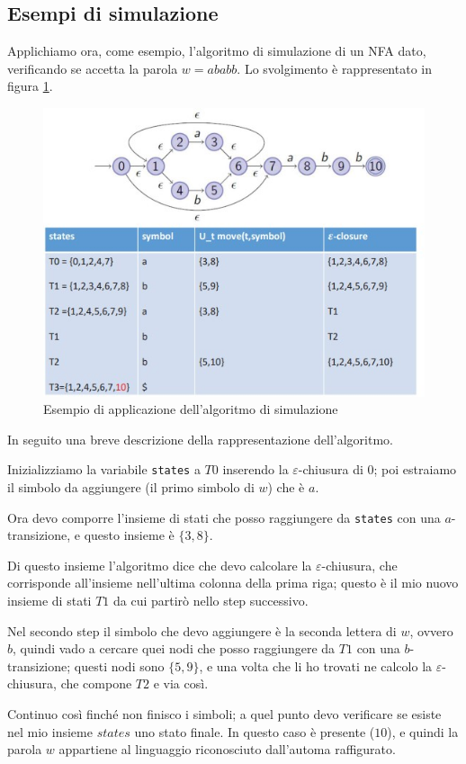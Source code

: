 \documentclass[class=book, crop=false, oneside, 12pt]{standalone}
\begin{document}
\subsection{Esempi di simulazione}
Applichiamo ora, come esempio, l'algoritmo di simulazione di un NFA dato, verificando se accetta la parola \(w  = ababb\). Lo svolgimento è rappresentato in figura \ref{simulazione_es_1}.

\begin{figure}
    \centering
    \includegraphics[width=.6\textwidth,keepaspectratio]{simulazione_es_1}
    \caption{Esempio di applicazione dell'algoritmo di simulazione}
    \label{simulazione_es_1}
\end{figure}

\noindent In seguito una breve descrizione della rappresentazione dell'algoritmo.

Inizializziamo la variabile \texttt{states} a \(T0\) inserendo la \(\varepsilon\)-chiusura di \(0\); poi estraiamo il simbolo da aggiungere (il primo simbolo di \(w\)) che è \(a\).

Ora devo comporre l’insieme di stati che posso raggiungere da \texttt{states} con una \(a\)-transizione, e questo insieme è \(\{3, 8\}\). 

Di questo insieme l’algoritmo dice che devo calcolare la \(\varepsilon\)-chiusura, che corrisponde all’insieme nell’ultima colonna della prima riga; questo è il mio nuovo insieme di stati \(T1\) da cui partirò nello step successivo.

Nel secondo step il simbolo che devo aggiungere è la seconda lettera di \(w\), ovvero \(b\), quindi vado a cercare quei nodi che posso raggiungere da \(T1\) con una \(b\)-transizione; questi nodi sono \(\{5,9\}\), e una volta che li ho trovati ne calcolo la \(\varepsilon\)-chiusura, che compone \(T2\) e via così.

Continuo così finché non finisco i simboli; a quel punto devo verificare se esiste nel mio insieme \(states\) uno stato finale. In questo caso è presente (\(10\)), e quindi la parola \(w\) appartiene al linguaggio riconosciuto dall’automa raffigurato.
\end{document}
